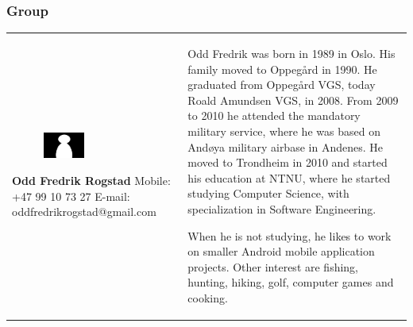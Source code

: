 \documentclass[11pt]{book}
\begin{document}
\subsubsection{Group}
\begin{table}[H]
\centering
\begin{tabular}{ p{7cm} p{7cm} }
\parbox{7cm}{
\begin{figure}[H]
      \includegraphics[width=0.4\textwidth]{Figures/Person.png}
      \label{fig:partners_group_odd}
\end{figure}
\textbf{Odd Fredrik Rogstad}\\
Mobile: +47 99 10 73 27\\
E-mail: oddfredrikrogstad@gmail.com} & \parbox{7cm}{
Odd Fredrik was born in 1989 in Oslo. His family moved to Oppegård in 1990. He graduated from Oppegård VGS, today Roald Amundsen VGS, in 2008. From 2009 to 2010 he attended the mandatory military service, where he was based on Andøya military airbase in Andenes. He moved to Trondheim in 2010 and started his education at NTNU, where he started studying Computer Science, with specialization in Software Engineering. 

When he is not studying, he likes to work on smaller Android mobile application projects. Other interest are fishing, hunting, hiking, golf, computer games and cooking.
}
\end{tabular}
\label{tab:partners_group_odd}
\end{table}
\end{document}
